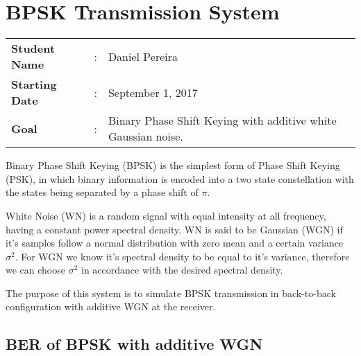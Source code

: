 \clearpage
\section{BPSK Transmission System}

\begin{tcolorbox}	
\begin{tabular}{p{2.75cm} p{0.2cm} p{10.5cm}} 	
\textbf{Student Name}  &:& Daniel Pereira\\
\textbf{Starting Date} &:& September 1, 2017\\
\textbf{Goal}          &:& Binary Phase Shift Keying with additive white Gaussian noise.
\end{tabular}
\end{tcolorbox}

Binary Phase Shift Keying (BPSK) is the simplest form of Phase Shift Keying (PSK), in which binary information is encoded into a two state constellation with the states being separated by a phase shift of $\pi$.
\par
White Noise (WN) is a random signal with equal intensity at all frequency, having a constant power spectral density. WN is said to be Gaussian (WGN) if it's samples follow a normal distribution with zero mean and a certain variance $\sigma^2$. For WGN we know it's spectral density to be equal to it's variance, therefore we can choose $\sigma^2$ in accordance with the desired spectral density.
\par
The purpose of this system is to simulate BPSK transmission in back-to-back configuration with additive WGN at the receiver.

\subsection{BER of BPSK with additive WGN}

